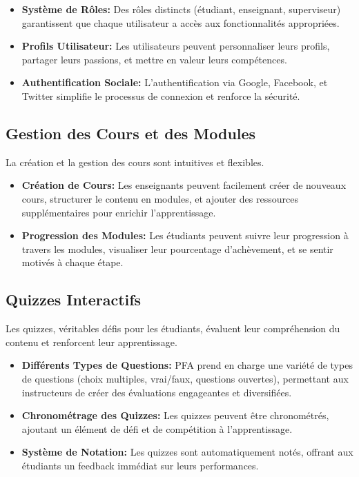\begin{itemize}
    \item \textbf{Système de Rôles:} Des rôles distincts (étudiant, enseignant, superviseur) garantissent que chaque utilisateur a accès aux fonctionnalités appropriées.
    \item \textbf{Profils Utilisateur:} Les utilisateurs peuvent personnaliser leurs profils, partager leurs passions, et mettre en valeur leurs compétences.
    \item \textbf{Authentification Sociale:} L'authentification via Google, Facebook, et Twitter simplifie le processus de connexion et renforce la sécurité.
\end{itemize}
\newpage
\subsection{Gestion des Cours et des Modules}

La création et la gestion des cours sont intuitives et flexibles.

\begin{itemize}
    \item \textbf{Création de Cours:} Les enseignants peuvent facilement créer de nouveaux cours, structurer le contenu en modules, et ajouter des ressources supplémentaires pour enrichir l'apprentissage.
    \item \textbf{Progression des Modules:} Les étudiants peuvent suivre leur progression à travers les modules, visualiser leur pourcentage d'achèvement, et se sentir motivés à chaque étape.
\end{itemize}

\subsection{Quizzes Interactifs}

Les quizzes, véritables défis pour les étudiants, évaluent leur compréhension du contenu et renforcent leur apprentissage.

\begin{itemize}
    \item \textbf{Différents Types de Questions:} PFA prend en charge une variété de types de questions (choix multiples, vrai/faux, questions ouvertes), permettant aux instructeurs de créer des évaluations engageantes et diversifiées.
    \item \textbf{Chronométrage des Quizzes:} Les quizzes peuvent être chronométrés, ajoutant un élément de défi et de compétition à l'apprentissage.
    \item \textbf{Système de Notation:} Les quizzes sont automatiquement notés, offrant aux étudiants un feedback immédiat sur leurs performances.
\end{itemize}

